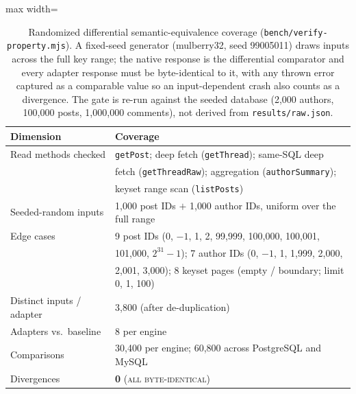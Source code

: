 \begin{table}[htbp]
  \centering
  \caption{Randomized differential semantic-equivalence coverage
    (\texttt{bench/verify-property.mjs}). A fixed-seed generator (mulberry32, seed
    99005011) draws inputs across the full key range; the native response is the differential comparator and every
    adapter response must be byte-identical to it, with any thrown error captured as a comparable
    value so an input-dependent crash also counts as a divergence. The gate is re-run against the
    seeded database (2{,}000 authors, 100{,}000 posts, 1{,}000{,}000 comments), not derived from
    \texttt{results/raw.json}.}
  \label{tab:semantic_equivalence}
  \begin{adjustbox}{max width=\textwidth}
  \begin{tabular}{l l}
    \toprule
    Dimension & Coverage \\
    \midrule
    Read methods checked & \texttt{getPost}; deep fetch (\texttt{getThread}); same-SQL deep \\
                         & fetch (\texttt{getThreadRaw}); aggregation (\texttt{authorSummary}); \\
                         & keyset range scan (\texttt{listPosts}) \\
    \midrule
    Seeded-random inputs & 1{,}000 post IDs $+$ 1{,}000 author IDs, uniform over the full range \\
    Edge cases           & 9 post IDs (0, $-1$, 1, 2, 99{,}999, 100{,}000, 100{,}001, \\
                         & 101{,}000, $2^{31}{-}1$); 7 author IDs (0, $-1$, 1, 1{,}999, 2{,}000, \\
                         & 2{,}001, 3{,}000); 8 keyset pages (empty / boundary; limit 0, 1, 100) \\
    Distinct inputs / adapter & 3{,}800 (after de-duplication) \\
    \midrule
    Adapters vs.\ baseline & 8 per engine \\
    Comparisons          & 30{,}400 per engine; 60{,}800 across PostgreSQL and MySQL \\
    Divergences          & \textbf{0} (\textsc{all byte-identical}) \\
    \bottomrule
  \end{tabular}
  \end{adjustbox}
\end{table}
